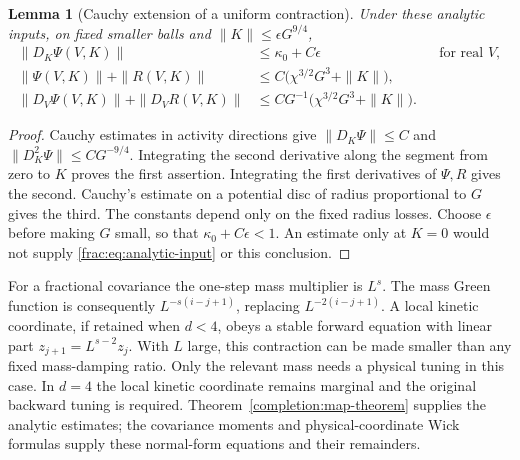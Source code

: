 \documentclass[11pt]{article}
\newtheorem{lemma}[proposition]{Lemma}
\begin{document}
\begin{lemma}[Cauchy extension of a uniform contraction]
\label{frac:lem:cauchy}
Under these analytic inputs, on fixed smaller balls and
\(\|K\|\le\epsilon G^{9/4}\),
\begin{align*}
 \|D_K\Psi(V,K)\|&\le\kappa_0+C\epsilon
                         &&\text{for real }V,\\
 \|\Psi(V,K)\|+\|R(V,K)\|
    &\le C\bigl(\chi^{3/2}G^3+\|K\|\bigr),\\
 \|D_V\Psi(V,K)\|+\|D_VR(V,K)\|
    &\le CG^{-1}\bigl(\chi^{3/2}G^3+\|K\|\bigr).
\end{align*}
\end{lemma}
\begin{proof}
Cauchy estimates in activity directions give
\(\|D_K\Psi\|\le C\) and
\(\|D_K^2\Psi\|\le CG^{-9/4}\). Integrating the second derivative
along the segment from zero to \(K\) proves the first assertion.
Integrating the first derivatives of \(\Psi,R\) gives the second.
Cauchy's estimate on a potential disc of radius proportional to \(G\)
gives the third. The constants depend only on the fixed radius losses.
Choose \(\epsilon\) before making \(G\) small, so that
\(\kappa_0+C\epsilon<1\). An estimate only at \(K=0\) would not
supply \eqref{frac:eq:analytic-input} or this conclusion.
\end{proof}

For a fractional covariance the one-step mass multiplier is \(L^s\).
The mass Green function is consequently
\(L^{-s(i-j+1)}\), replacing \(L^{-2(i-j+1)}\). A local kinetic
coordinate, if retained when \(d<4\), obeys a stable forward equation
with linear part \(z_{j+1}=L^{s-2}z_j\). With \(L\) large, this
contraction can be made smaller than any fixed mass-damping ratio.
Only the relevant mass needs a physical tuning in this case. In
\(d=4\) the local kinetic coordinate remains marginal and the original
backward tuning is required. Theorem~\ref{completion:map-theorem} supplies the analytic estimates; the covariance moments and physical-coordinate Wick formulas supply these normal-form equations and their remainders.
\end{document}
